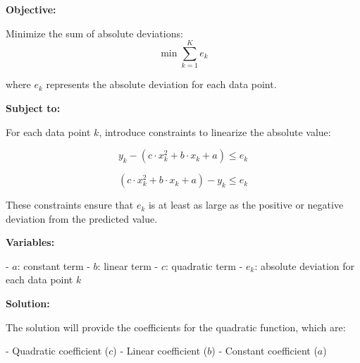 \documentclass{article}
\begin{document}
\textbf{Objective:}

Minimize the sum of absolute deviations:
\[
\min \sum_{k=1}^{K} e_k
\]

where \( e_k \) represents the absolute deviation for each data point.

\textbf{Subject to:}

For each data point \( k \), introduce constraints to linearize the absolute value:

\[
y_k - (c \cdot x_k^2 + b \cdot x_k + a) \leq e_k
\]

\[
(c \cdot x_k^2 + b \cdot x_k + a) - y_k \leq e_k
\]

These constraints ensure that \( e_k \) is at least as large as the positive or negative deviation from the predicted value.

\textbf{Variables:}

- \( a \): constant term
- \( b \): linear term
- \( c \): quadratic term
- \( e_k \): absolute deviation for each data point \( k \)

\textbf{Solution:}

The solution will provide the coefficients for the quadratic function, which are:

- Quadratic coefficient (\(c\))
- Linear coefficient (\(b\))
- Constant coefficient (\(a\))
\end{document}
